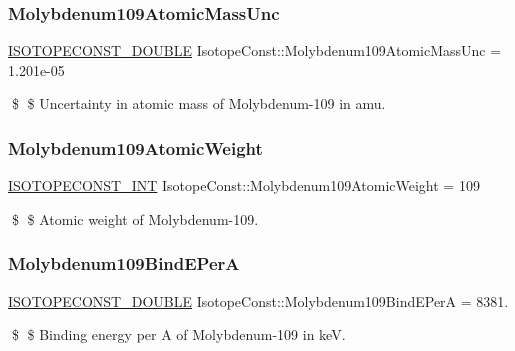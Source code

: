 \subsubsection{\texorpdfstring{Molybdenum109\+Atomic\+Mass\+Unc}{Molybdenum109AtomicMassUnc}}
{\footnotesize\ttfamily \mbox{\hyperlink{group___isotope_const-_macros_ga8f45a7272ce02c0b4c65c44636ed719a}{I\+S\+O\+T\+O\+P\+E\+C\+O\+N\+S\+T\+\_\+\+D\+O\+U\+B\+LE}} Isotope\+Const\+::\+Molybdenum109\+Atomic\+Mass\+Unc = 1.\+201e-\/05}

\$ \$ Uncertainty in atomic mass of Molybdenum-\/109 in amu. \mbox{\label{group___isotope_const-_molybdenum-_mo109_gac1a2b7d6bf60a1f1dc3ea5fbf47b4ee6}} 
\subsubsection{\texorpdfstring{Molybdenum109\+Atomic\+Weight}{Molybdenum109AtomicWeight}}
{\footnotesize\ttfamily \mbox{\hyperlink{group___isotope_const-_macros_ga5f18360b3e99483a35c32d789e62621c}{I\+S\+O\+T\+O\+P\+E\+C\+O\+N\+S\+T\+\_\+\+I\+NT}} Isotope\+Const\+::\+Molybdenum109\+Atomic\+Weight = 109}

\$ \$ Atomic weight of Molybdenum-\/109. \mbox{\label{group___isotope_const-_molybdenum-_mo109_ga0c90d949bb98985290761cc0a9aafd56}} 
\subsubsection{\texorpdfstring{Molybdenum109\+Bind\+E\+PerA}{Molybdenum109BindEPerA}}
{\footnotesize\ttfamily \mbox{\hyperlink{group___isotope_const-_macros_ga8f45a7272ce02c0b4c65c44636ed719a}{I\+S\+O\+T\+O\+P\+E\+C\+O\+N\+S\+T\+\_\+\+D\+O\+U\+B\+LE}} Isotope\+Const\+::\+Molybdenum109\+Bind\+E\+PerA = 8381.}

\$ \$ Binding energy per A of Molybdenum-\/109 in keV. \mbox{\label{group___isotope_const-_molybdenum-_mo109_ga451a55bfdd465b2760496d1db0efab34}} 
